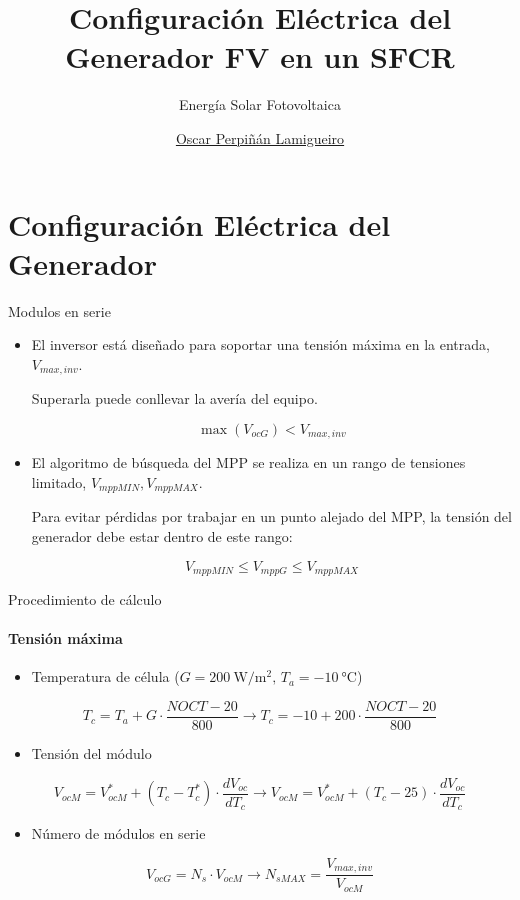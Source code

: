 \documentclass[aspectratio=169, usenames,svgnames,dvipsnames]{beamer}
\author{\href{https://oscarperpinan.github.io}{Oscar Perpiñán Lamigueiro}}
\date{}
\title{Configuración Eléctrica del Generador FV en un SFCR}
\subtitle{Energía Solar Fotovoltaica}
\institute[UPM]{Universidad Politécnica de Madrid}
\begin{document}
\maketitle

\section{Configuración Eléctrica del Generador}
\label{sec:org071341c}

\begin{frame}[label={sec:org41f92ae}]{Modulos en serie}
\begin{itemize}
\item El inversor está diseñado para soportar una \alert{tensión máxima en la
entrada}, \(V_{max,inv}\).

Superarla puede conllevar la \alert{avería} del equipo.

\[
  \max(V_{ocG}) < V_{max,inv}
\]
\item El algoritmo de \alert{búsqueda del MPP} se realiza en un
rango de tensiones limitado, \(V_{mppMIN}, V_{mppMAX}\).

Para \alert{evitar pérdidas} por trabajar en un punto alejado del MPP, la tensión del generador debe estar dentro de este rango:

\[
  V_{mppMIN} \leq V_{mppG} \leq V_{mppMAX}
\]
\end{itemize}
\end{frame}
\begin{frame}[label={sec:org13b7bce}]{Procedimiento de cálculo}
\framesubtitle{Tensión máxima}

\begin{itemize}
\item Temperatura de célula (\(G=\SI{200}{\watt\per\meter\squared},\, T_{a}=\SI{-10}{\celsius}\))
\end{itemize}
\[
  T_{c} = T_{a} + G \cdot \frac{NOCT-20}{800} \rightarrow   T_{c} = -10 + 200 \cdot \frac{NOCT-20}{800}
\]

\begin{itemize}
\item Tensión del módulo
\end{itemize}
\[
  V_{ocM} = V_{ocM}^{*} + (T_{c}-T_{c}^{*})\cdot\frac{dV_{oc}}{dT_{c}} \rightarrow V_{ocM} = V_{ocM}^{*} + (T_{c}- 25)\cdot\frac{dV_{oc}}{dT_{c}}
\]
\begin{itemize}
\item Número de módulos en serie
\end{itemize}
\[
      V_{ocG} = N_s \cdot V_{ocM} \rightarrow N_{sMAX}=\frac{V_{max,inv}}{V_{ocM}}
\]
\end{frame}
\end{document}
